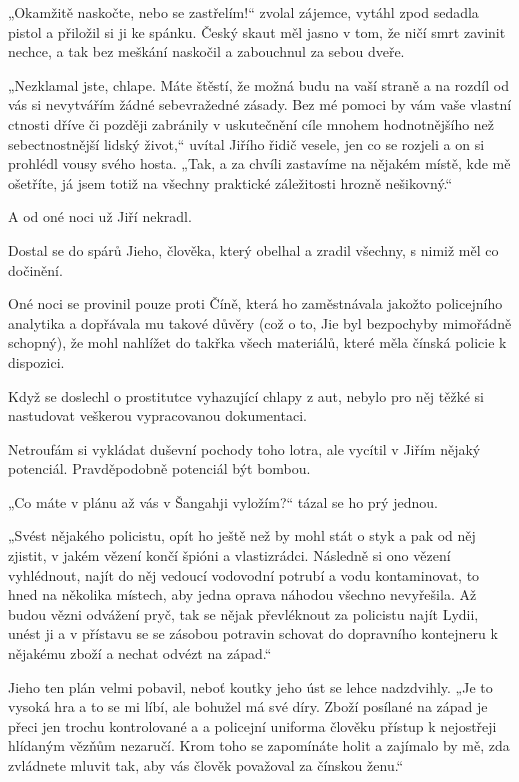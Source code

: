 „Okamžitě naskočte, nebo se zastřelím!“ zvolal zájemce, vytáhl zpod sedadla pistol a přiložil si ji ke spánku. Český skaut měl jasno v tom, že ničí smrt zavinit nechce, a tak bez meškání naskočil a zabouchnul za sebou dveře.

„Nezklamal jste, chlape. Máte štěstí, že možná budu na vaší straně a na rozdíl od vás si nevytvářím žádné sebevražedné zásady. Bez mé pomoci by vám vaše vlastní ctnosti dříve či později zabránily v uskutečnění cíle mnohem hodnotnějšího než sebectnostnější lidský život,“ uvítal Jiřího řidič vesele, jen co se rozjeli a on si prohlédl vousy svého hosta. „Tak, a za chvíli zastavíme na nějakém místě, kde mě ošetříte, já jsem totiž na všechny praktické záležitosti hrozně nešikovný.“
\vspace{0.75cm}

A od oné noci už Jiří nekradl.

Dostal se do spárů Jieho, člověka, který obelhal a zradil všechny, s nimiž měl co dočinění.

Oné noci se provinil pouze proti Číně, která ho zaměstnávala jakožto policejního analytika a dopřávala mu takové důvěry (což o to, Jie byl bezpochyby mimořádně schopný), že mohl nahlížet do takřka všech materiálů, které měla čínská policie k dispozici.

Když se doslechl o prostitutce vyhazující chlapy z aut, nebylo pro něj těžké si nastudovat veškerou vypracovanou dokumentaci.

Netroufám si vykládat duševní pochody toho lotra, ale vycítil v Jiřím nějaký potenciál. Pravděpodobně potenciál být bombou.

„Co máte v plánu až vás v Šangahji vyložím?“ tázal se ho prý jednou.

„Svést nějakého policistu, opít ho ještě než by mohl stát o styk a pak od něj zjistit, v jakém vězení končí špióni a vlastizrádci. Následně si ono vězení vyhlédnout, najít do něj vedoucí vodovodní potrubí a vodu kontaminovat, to hned na několika místech, aby jedna oprava náhodou všechno nevyřešila. Až budou vězni odvážení pryč, tak se nějak převléknout za policistu najít Lydii, unést ji a v přístavu se se zásobou potravin schovat do dopravního kontejneru k nějakému zboží a nechat odvézt na západ.“

Jieho ten plán velmi pobavil, neboť koutky jeho úst se lehce nadzdvihly. „Je to vysoká hra a to se mi líbí, ale bohužel má své díry. Zboží posílané na západ je přeci jen trochu kontrolované a a policejní uniforma člověku přístup k nejostřeji hlídaným vězňům nezaručí. Krom toho se zapomínáte holit a zajímalo by mě, zda zvládnete mluvit tak, aby vás člověk považoval za čínskou ženu.“

